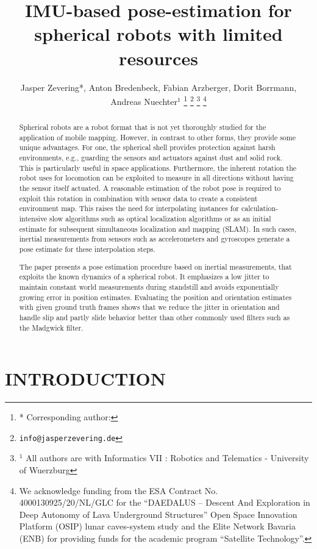 \documentclass[letterpaper, 10 pt, conference]{ieeeconf}  %
\title{\LARGE \bf
IMU-based pose-estimation for spherical robots with limited resources
}
\author{Jasper Zevering*, Anton Bredenbeck, Fabian Arzberger, Dorit Borrmann, Andreas Nuechter$^{1}$%
\thanks{*
        Corresponding author: }%
        \thanks{ \quad  \tt\small info@jasperzevering.de}%
\thanks{$^{1}$ All authors are with Informatics VII : Robotics and Telematics - University of Wuerzburg}%
\thanks{We acknowledge funding from the ESA Contract No. 4000130925/20/NL/GLC for the ``DAEDALUS -- Descent And Exploration in Deep Autonomy of Lava Underground Structures'' Open Space Innovation Platform (OSIP) lunar caves-system study and the Elite Network Bavaria (ENB) for providing funds for the academic program ``Satellite Technology''.}
}
\begin{document}
\maketitle
\thispagestyle{empty}
\pagestyle{empty}


\begin{abstract}

Spherical robots are a robot format that is not yet thoroughly studied for the application of mobile mapping.
However, in contrast to other forms, they provide some unique advantages.
For one, the spherical shell provides protection against harsh environments, e.g., guarding the sensors and actuators against dust and solid rock.
This is particularly useful in space applications. 
Furthermore, the inherent rotation the robot uses for locomotion can be exploited to measure in all directions without having the sensor itself actuated.
A reasonable estimation of the robot pose is required to exploit this rotation in combination with sensor data to create a consistent environment map. 
This raises the need for interpolating instances for calculation-intensive slow algorithms such as optical localization algorithms or as an initial estimate for subsequent simultaneous localization and mapping (SLAM).
In such cases,  inertial measurements from sensors such as accelerometers and gyroscopes generate a pose estimate for these interpolation steps.

The paper presents a pose estimation procedure based on inertial measurements, that exploits the known dynamics of a spherical robot. 
It emphasizes a low jitter to maintain constant world measurements during standstill and avoids exponentially growing error in position estimates. 
Evaluating the position and orientation estimates with given ground truth frames shows that we reduce the jitter in orientation and handle slip and partly slide behavior better than other commonly used filters such as the Madgwick filter.

\end{abstract}


\section{INTRODUCTION}
\end{document}
